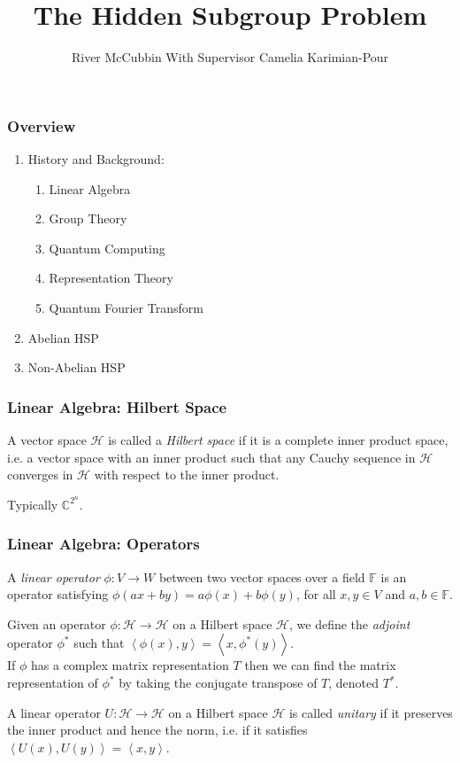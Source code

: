 \documentclass{beamer}
\title{The Hidden Subgroup Problem}
\author{River McCubbin With Supervisor Camelia Karimian-Pour}
\newcommand{\inner}[2]{\left\langle #1, #2 \right\rangle}
\newcommand{\bb}[1]{\mathbb{#1}}
\renewcommand{\cal}[1]{\mathcal{#1}}
\begin{document}
\frame{\titlepage}

\begin{frame}
\frametitle{Overview}
    \begin{enumerate}
    \item History and Background:
        \begin{enumerate}
        \item Linear Algebra
        \item Group Theory
        \item Quantum Computing
        \item Representation Theory
        \item Quantum Fourier Transform
        \end{enumerate}
    \item Abelian HSP
    \item Non-Abelian HSP
    \end{enumerate}
\end{frame}

\begin{frame}
\frametitle{Linear Algebra: Hilbert Space}\label{history:linear_algebra}
        \begin{definition}\label{def:hilbert_space}
            A vector space $\cal{H}$ is called a \textit{Hilbert space} if it is a complete inner product space, i.e. a vector space with an inner product such that any Cauchy sequence in $\cal{H}$ converges in $\cal{H}$ with respect to the inner product.
        \end{definition}

        Typically $\bb{C}^{2^n}$.
\end{frame}

\begin{frame}
\frametitle{Linear Algebra: Operators}
        \begin{definition}\label{def:linear_operator}
            A \textit{linear operator} $\phi : V \to W$ between two vector spaces over a field $\bb{F}$ is an operator satisfying $\phi(ax + by) = a\phi(x) + b\phi(y)$, for all $x, y \in V$ and $a, b \in \bb{F}$.
        \end{definition}
        \begin{definition}\label{def:adjoint}
            Given an operator $\phi : \cal{H} \to \cal{H}$ on a Hilbert space $\cal{H}$, we define the \textit{adjoint} operator $\phi^*$ such that $\inner{\phi(x)}{y} = \inner{x}{\phi^*(y)}$.\\
            If $\phi$ has a complex matrix representation $T$ then we can find the matrix representation of $\phi^*$ by taking the conjugate transpose of $T$, denoted $T^*$.
        \end{definition}
        \begin{definition}\label{def:unitary_operator}
            A linear operator $U : \cal{H} \to \cal{H}$ on a Hilbert space $\cal{H}$ is called \textit{unitary} if it preserves the inner product and hence the norm, i.e. if it satisfies $\inner{U(x)}{U(y)} = \inner{x}{y}$.
        \end{definition}
\end{frame}
\end{document}
